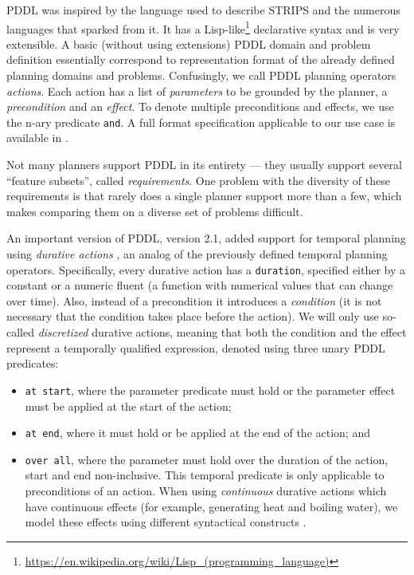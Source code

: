 PDDL was inspired by the language used to describe STRIPS \citep{Fikes1971}
and the numerous languages that sparked from it.
It has a Lisp-like\footnote{\url{https://en.wikipedia.org/wiki/Lisp_(programming_language)}}
declarative syntax and is very extensible.
A basic (without using extensions) PDDL domain and problem definition essentially correspond to representation format of the already defined planning domains and problems. Confusingly, we call PDDL planning operators \textit{actions}.
Each action has a list of \textit{parameters} to be grounded by the planner,
a \textit{precondition} and an \textit{effect}. To denote multiple
preconditions and effects, we use the n-ary predicate \texttt{and}.
A full format specification applicable to our use case is available in \citet[Appendix A]{Fox2003}.

Not many planners support PDDL in its entirety --- they usually support 
several ``feature subsets'', called \textit{requirements}.
One problem with the diversity of these requirements is that rarely does
a single planner support more than a few, which makes comparing them on a diverse
set of problems difficult.

An important version of PDDL, version 2.1, added support for temporal
planning using \textit{durative actions} \citep[Section~5]{Fox2003},
an analog of the previously defined temporal planning operators.
Specifically, every durative action has a \texttt{duration}, specified
either by a constant or a numeric fluent (a function with numerical values that
can change over time). Also, instead of a precondition it introduces a \textit{condition} (it is not necessary that the condition takes place before the action).
We will only use so-called \textit{discretized} durative actions, meaning that both the condition and the effect represent a temporally qualified expression,
denoted using three unary PDDL predicates:
\begin{itemize}
\item \texttt{at start}, where the parameter predicate must hold or the parameter effect must be applied at the start of the action;
\item \texttt{at end}, where it must hold or be applied at the end of the action; and
\item \texttt{over all}, where the parameter must hold over the duration of the action, start and end non-inclusive. This temporal predicate is only applicable to preconditions of an action. When using \textit{continuous} durative actions which have continuous effects (for example, generating heat and boiling water), we model these
effects using different syntactical constructs \citep[Section~5.3]{Fox2003}.
\end{itemize}

